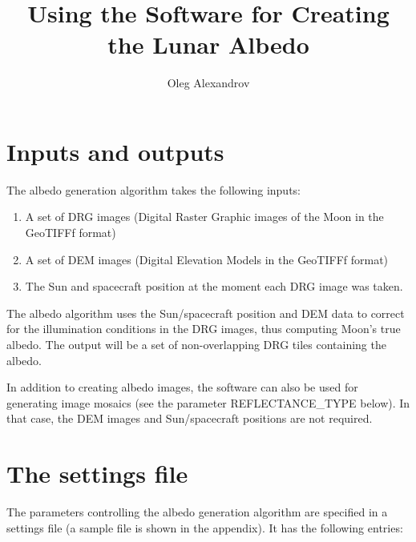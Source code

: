 \documentclass{article}
\title{Using the Software for Creating the Lunar Albedo}
\author{Oleg Alexandrov}
\begin{document}
\maketitle

\section{Inputs and outputs}

The albedo generation algorithm takes the following inputs:
\begin{enumerate}
\item A set of DRG images (Digital Raster Graphic images of the Moon in the GeoTIFFf format)
\item A set of DEM images (Digital Elevation Models in the GeoTIFFf format)
\item The Sun and spacecraft position at the moment each DRG image was
  taken. 
\end{enumerate}

\noindent 

The albedo algorithm uses the Sun/spacecraft position and DEM data to
correct for the illumination conditions in the DRG images, thus
computing Moon's true albedo. The output will be a set of
non-overlapping DRG tiles containing the albedo.

In addition to creating albedo images, the software can also be used
for generating image mosaics (see the parameter REFLECTANCE\_TYPE
below). In that case, the DEM images and Sun/spacecraft positions are
not required.

\section{The settings file}

The parameters controlling the albedo generation algorithm are specified in a
settings file (a sample file is shown in the appendix). It has the following entries:
\end{document}
